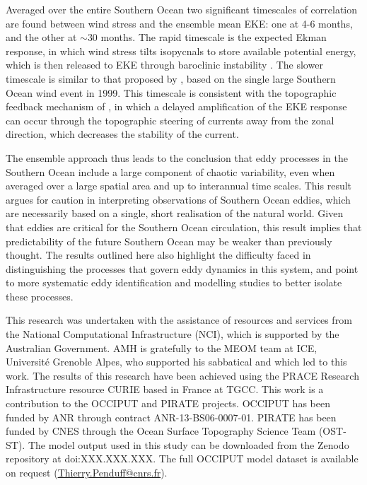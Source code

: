 \documentclass[linenumbers]{agujournal2019}
\begin{document}
Averaged over the entire Southern Ocean two significant timescales of correlation are found between wind stress and the ensemble mean EKE: one at 4-6 months, and the other at $\sim$30 months.
The rapid timescale is the expected Ekman response, in which wind stress tilts isopycnals to store available potential energy, which is then released to EKE through baroclinic instability \citep[e.g.][]{Sinha2016}.
The slower timescale is similar to that proposed by \citet{Meredith-Hogg-2006}, based on the single large Southern Ocean wind event in 1999.
This timescale is consistent with the  topographic feedback mechanism of \citet{Hogg-Blundell-2006}, in which a delayed amplification of the EKE response can occur through the topographic steering of currents away from the zonal direction, which decreases the stability of the current.
 
The ensemble approach thus leads to the conclusion that eddy processes in the Southern Ocean include a large component of chaotic variability, even when averaged over a large spatial area and up to interannual time scales.
This result argues for caution in interpreting observations of Southern Ocean eddies, which are necessarily based on a single, short realisation of the natural world.
Given that eddies are critical for the Southern Ocean circulation, this result implies that predictability of the future Southern Ocean may be weaker than previously thought.
The results outlined here also highlight the difficulty faced in distinguishing the processes that govern eddy dynamics in this system, and point to more systematic eddy identification and modelling studies to better isolate these processes.
 


\acknowledgments
This research was undertaken with the assistance of resources and services from the National Computational Infrastructure (NCI), which is supported by the Australian Government.
AMH is gratefully to the MEOM team at ICE, Universit{\'e} Grenoble Alpes, who supported his sabbatical and which led to this work. 
The results of this research have been achieved using the PRACE Research Infrastructure resource CURIE based in France at TGCC. 
This work is a contribution to the OCCIPUT and PIRATE projects. 
OCCIPUT has been funded by ANR through contract ANR-13-BS06-0007-01. 
PIRATE has been funded by CNES through the Ocean Surface Topography Science Team (OST-ST). 
{\color{red}The model output used in this study can be downloaded from the Zenodo repository at doi:XXX.XXX.XXX.}
The full OCCIPUT model dataset is available on request (\href{mailto:Thierry.Penduff@cnrs.fr}{Thierry.Penduff@cnrs.fr}).


\end{document}
